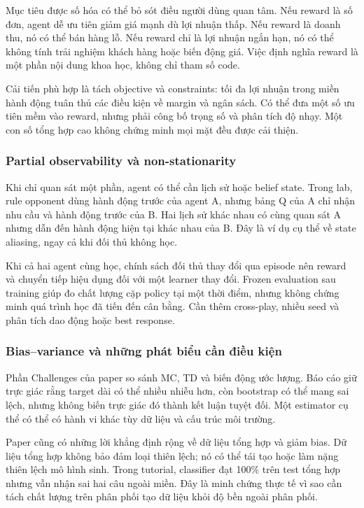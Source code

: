 Mục tiêu được số hóa có thể bỏ sót điều người dùng quan tâm. Nếu reward
là số đơn, agent dễ ưu tiên giảm giá mạnh dù lợi nhuận thấp. Nếu reward
là doanh thu, nó có thể bán hàng lỗ. Nếu reward chỉ là lợi nhuận ngắn
hạn, nó có thể không tính trải nghiệm khách hàng hoặc biến động giá.
Việc định nghĩa reward là một phần nội dung khoa học, không chỉ tham số
code.

Cải tiến phù hợp là tách objective và constraints: tối đa lợi nhuận
trong miền hành động tuân thủ các điều kiện về margin và ngân sách. Có
thể đưa một số ưu tiên mềm vào reward, nhưng phải công bố trọng số và
phân tích độ nhạy. Một con số tổng hợp cao không chứng minh mọi mặt đều
được cải thiện.

\subsubsection{Partial observability và
non-stationarity}\label{partial-observability-vuxe0-non-stationarity}

Khi chỉ quan sát một phần, agent có thể cần lịch sử hoặc belief state.
Trong lab, rule opponent dùng hành động trước của agent A, nhưng bảng Q
của A chỉ nhận nhu cầu và hành động trước của B. Hai lịch sử khác nhau
có cùng quan sát A nhưng dẫn đến hành động hiện tại khác nhau của B. Đây
là ví dụ cụ thể về state aliasing, ngay cả khi đối thủ không học.

Khi cả hai agent cùng học, chính sách đối thủ thay đổi qua episode nên
reward và chuyển tiếp hiệu dụng đối với một learner thay đổi. Frozen
evaluation sau training giúp đo chất lượng cặp policy tại một thời điểm,
nhưng không chứng minh quá trình học đã tiến đến cân bằng. Cần thêm
cross-play, nhiều seed và phân tích dao động hoặc best response.

\subsubsection{Bias--variance và những phát biểu cần điều
kiện}\label{biasvariance-vuxe0-nhux1eefng-phuxe1t-biux1ec3u-cux1ea7n-ux111iux1ec1u-kiux1ec7n}

Phần Challenges của paper so sánh MC, TD và biến động ước lượng. Báo cáo
giữ trực giác rằng target dài có thể nhiều nhiễu hơn, còn bootstrap có
thể mang sai lệch, nhưng không biến trực giác đó thành kết luận tuyệt
đối. Một estimator cụ thể có thể có hành vi khác tùy dữ liệu và cấu trúc
môi trường.

Paper cũng có những lời khẳng định rộng về dữ liệu tổng hợp và giảm
bias. Dữ liệu tổng hợp không bảo đảm loại thiên lệch; nó có thể tái tạo
hoặc làm nặng thiên lệch mô hình sinh. Trong tutorial, classifier đạt
100\% trên test tổng hợp nhưng vẫn nhận sai hai câu ngoài miền. Đây là
minh chứng thực tế vì sao cần tách chất lượng trên phân phối tạo dữ liệu
khỏi độ bền ngoài phân phối.

